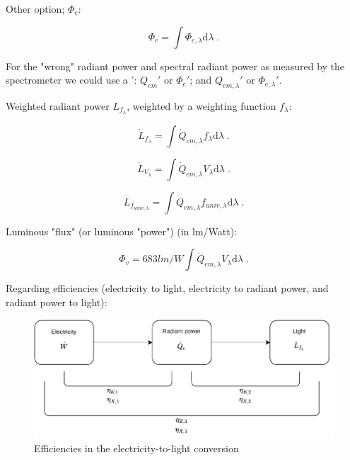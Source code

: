 Other option; $\Phi_{e}$:

\begin{equation}
  \Phi_{e} = \int \Phi_{e, \lambda} \mathrm{d}\lambda \; .
\end{equation}

For the "wrong" radiant power and spectral radiant power as measured by the spectrometer we could use a ': $Q_{em}'$ or $\Phi_{e}'$; and $Q_{em, \lambda}'$ or $\Phi_{e, \lambda}'$.


Weighted radiant power $L_{f_\lambda}$, weighted by a weighting function $f_\lambda$:

\begin{equation}
  \dot{L}_{f_{\lambda}} = \int \dot{Q}_{em, \lambda} f_{\lambda} \mathrm{d}\lambda \; .
\end{equation}

\begin{equation}
  \dot{L}_{V_{\lambda}} = \int \dot{Q}_{em, \lambda} V_{\lambda} \mathrm{d}\lambda \; .
\end{equation}

\begin{equation}
  \dot{L}_{f_{univ, \lambda}} = \int \dot{Q}_{em, \lambda} f_{univ, \lambda} \mathrm{d}\lambda \; .
\end{equation}


Luminous "flux" (or luminous "power") (in lm/Watt):

\begin{equation}
  \Phi_{v} = 683 lm/W \int \dot{Q}_{em, \lambda} V_{\lambda} \mathrm{d}\lambda \; .
\end{equation}


Regarding efficiencies (electricity to light, electricity to radiant power, and radiant power to light):

\begin{figure}
\centering
\includegraphics[width=1\linewidth]{figure_other/elec_to_light.pdf}
\caption{Efficiencies in the electricity-to-light conversion}
\end{figure}


